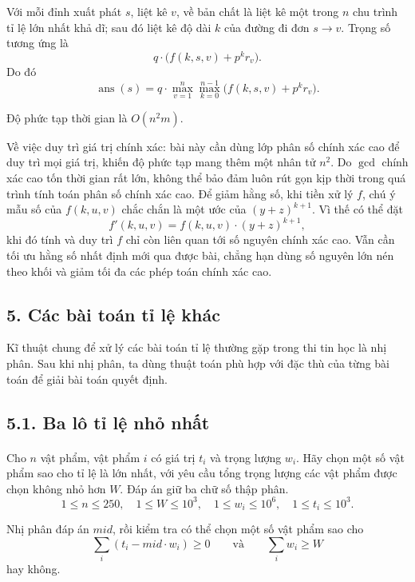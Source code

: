 \documentclass[11pt]{article}
\begin{document}
Với mỗi đỉnh xuất phát \(s\), liệt kê \(v\), về bản chất là liệt kê một trong
\(n\) chu trình tỉ lệ lớn nhất khả dĩ; sau đó liệt kê độ dài \(k\) của đường đi
đơn \(s\to v\). Trọng số tương ứng là
\[
  q\cdot\bigl(f(k,s,v)+p^k r_v\bigr).
\]
Do đó
\[
  \operatorname{ans}(s)
  =
  q\cdot
  \max_{v=1}^{n}\max_{k=0}^{n-1}
  \bigl(f(k,s,v)+p^k r_v\bigr).
\]

Độ phức tạp thời gian là \(O(n^2m)\).

Về việc duy trì giá trị chính xác: bài này cần dùng lớp phân số chính xác cao
để duy trì mọi giá trị, khiến độ phức tạp mang thêm một nhân tử \(n^2\). Do
\(\gcd\) chính xác cao tốn thời gian rất lớn, không thể bảo đảm luôn rút gọn
kịp thời trong quá trình tính toán phân số chính xác cao. Để giảm hằng số, khi
tiền xử lý \(f\), chú ý mẫu số của \(f(k,u,v)\) chắc chắn là một ước của
\((y+z)^{k+1}\). Vì thế có thể đặt
\[
  f'(k,u,v)=f(k,u,v)\cdot (y+z)^{k+1},
\]
khi đó tính và duy trì \(f\) chỉ còn liên quan tới số nguyên chính xác cao. Vẫn
cần tối ưu hằng số nhất định mới qua được bài, chẳng hạn dùng số nguyên lớn
nén theo khối và giảm tối đa các phép toán chính xác cao.

\subsection*{5. Các bài toán tỉ lệ khác}

Kĩ thuật chung để xử lý các bài toán tỉ lệ thường gặp trong thi tin học là
nhị phân. Sau khi nhị phân, ta dùng thuật toán phù hợp với đặc thù của từng bài
toán để giải bài toán quyết định.

\subsection*{5.1. Ba lô tỉ lệ nhỏ nhất}

\paragraph{}
Cho \(n\) vật phẩm, vật phẩm \(i\) có giá trị \(t_i\) và trọng lượng \(w_i\).
Hãy chọn một số vật phẩm sao cho tỉ lệ là lớn nhất, với yêu cầu tổng trọng
lượng các vật phẩm được chọn không nhỏ hơn \(W\). Đáp án giữ ba chữ số thập
phân.
\[
  1\le n\le250,\quad
  1\le W\le10^3,\quad
  1\le w_i\le10^6,\quad
  1\le t_i\le10^3.
\]

Nhị phân đáp án \(\mathit{mid}\), rồi kiểm tra có thể chọn một số vật phẩm sao
cho
\[
  \sum_i(t_i-\mathit{mid}\cdot w_i)\ge0
  \qquad\text{và}\qquad
  \sum_i w_i\ge W
\]
hay không.
\end{document}
